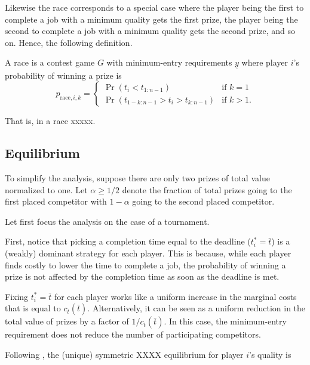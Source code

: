 \documentclass[12pt,]{article}
\theoremstyle{plain} %
\newcommand\deadline{\bar{t}}
\newcommand\target{\underline{y}}
\newcommand\race{\text{race}}
\newcommand\ctime{c_{t}}
\begin{document}
Likewise the race corresponds to a special case where the player being
the first to complete a job with a minimum quality gets the first prize,
the player being the second to complete a job with a minimum quality
gets the second prize, and so on. Hence, the following definition.

\begin{definition}
A race is a contest game $G$ with minimum-entry requirements $\target$ where player $i$'s probability of winning a prize is
\begin{equation}
  p_{\race, i, k} =
  \begin{cases}
    \Pr(t_i < t_{1:n-1}) & \text{if }k=1\\
    \Pr(t_{1-k:n-1} > t_i > t_{k:n-1}) & \text{if }k>1.
  \end{cases}
\end{equation}
\end{definition}

That is, in a race xxxxx.

\subsection{Equilibrium}\label{equilibrium}

To simplify the analysis, suppose there are only two prizes of total
value normalized to one. Let \(\alpha\geq 1/2\) denote the fraction of
total prizes going to the first placed competitor with \(1-\alpha\)
going to the second placed competitor.

Let first focus the analysis on the case of a tournament.

First, notice that picking a completion time equal to the deadline
(\(t_i^*=\deadline\)) is a (weakly) dominant strategy for each player.
This is because, while each player finds costly to lower the time to
complete a job, the probability of winning a prize is not affected by
the completion time as soon as the deadline is met.

Fixing \(t_i^*=\deadline\) for each player works like a uniform increase
in the marginal costs that is equal to \(\ctime(\deadline)\).
Alternatively, it can be seen as a uniform reduction in the total value
of prizes by a factor of \(1/\ctime(\deadline)\). In this case, the
minimum-entry requirement does not reduce the number of participating
competitors.

Following \citet{moldovanu2001optimal}, the (unique) symmetric XXXX
equilibrium for player \(i\)'s quality is
\end{document}

